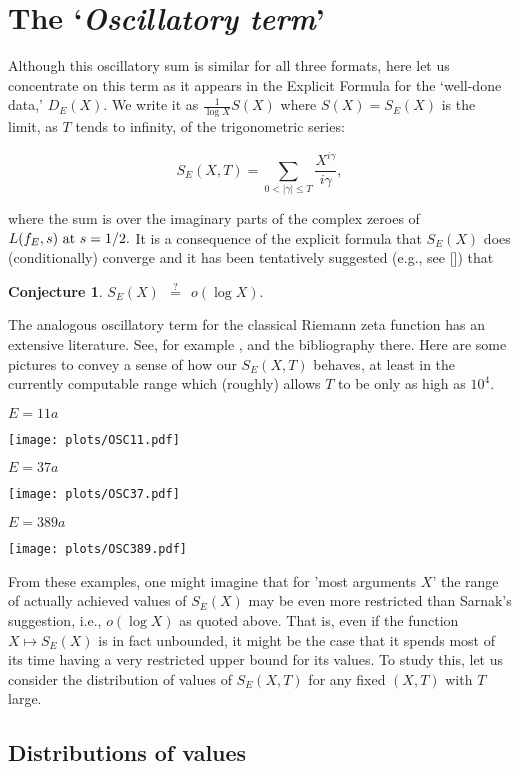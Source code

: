 \documentclass[11pt]{article}
\theoremstyle{plain}
\newtheorem{conjecture}[theorem]{Conjecture}
\theoremstyle{definition}
\numberwithin{equation}{section}
\numberwithin{figure}{section}
\numberwithin{table}{section}
\begin{document}
 \section{The `{\it Oscillatory term}'}\label{osc}
  Although this oscillatory sum is similar for all three formats, here let us concentrate on this term as it appears in the Explicit Formula for the `well-done data,'  $D_E(X)$. We write it as  ${\frac{1}{\log X}}S(X)$ where $S(X)=S_E(X)$ is the limit, as $T$ tends to infinity, of the trigonometric series:

  $$S_E(X,T) = \sum_{0<|\gamma| \le T}{\frac{X^{i\gamma}}{i\gamma}},$$

  where the sum is over the imaginary parts of the complex zeroes of  $L(f_E, s)\ {\rm at}\ s=1/2.$   It is a consequence of the explicit formula that $S_E(X)$ does (conditionally) converge and it has been tentatively suggested  (e.g., see [{\cite{S}}]) that

  \begin{conjecture}  $ S_E(X)\ \  {\stackrel{?}{=}}\ \  o(\log X).$\end{conjecture}   The analogous oscillatory term for the classical Riemann zeta function  has an extensive literature. See, for example \cite{G}, \cite{Fu} and the bibliography there. Here are some pictures to convey a sense of how our $S_E(X,T)$ behaves, at least in the currently computable range which (roughly) allows $T$ to be only as high as  $10^4$.
  \newpage
  \centerline{ $E = 11a$}
 \vskip10pt
  \texttt{[image: plots/OSC11.pdf]}

  \centerline{ $E = 37a$}
  \texttt{[image: plots/OSC37.pdf]}
   \vskip20pt
  \centerline{ $E = 389a$}
\vskip20pt
  \texttt{[image: plots/OSC389.pdf]}

 From these examples, one might imagine that for 'most arguments $X$' the range of actually achieved values of $S_E(X)$  may be even more restricted than Sarnak's suggestion, i.e., $o(\log X)$ as quoted above. That is, even if  the function $X \mapsto S_E(X)$ is in fact unbounded, it might be the case that it spends most of its time having a very restricted upper bound for its values.  To study this, let us consider the distribution of values of $S_E(X,T)$ for any fixed $(X,T)$ with $T$ large.


\subsection{Distributions of values }
\end{document}
